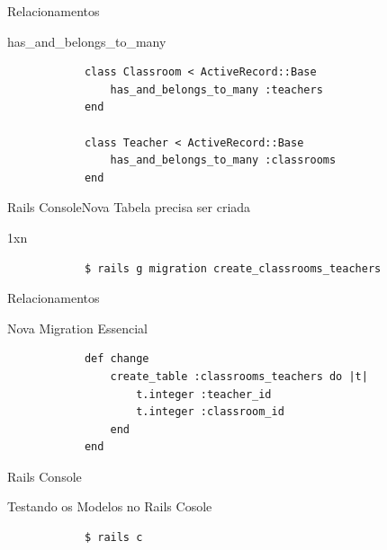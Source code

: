 \documentclass{beamer}
\begin{document}
\begin{frame}[fragile]{Relacionamentos}
	\begin{block} {\LARGE has\_and\_belongs\_to\_many}
		\begin{verbatim}
		  	class Classroom < ActiveRecord::Base
		  	    has_and_belongs_to_many :teachers
		  	end
		  	
		  	class Teacher < ActiveRecord::Base
		  	    has_and_belongs_to_many :classrooms
		  	end
		\end{verbatim}
	\end{block}
\end{frame}

\begin{frame}[fragile]{Rails Console}{Nova Tabela precisa ser criada}
	\begin{block} {1xn}
		\begin{verbatim}
		  	$ rails g migration create_classrooms_teachers
		\end{verbatim}
	\end{block}
\end{frame}

\begin{frame}[fragile]{Relacionamentos}
	\begin{block} {\LARGE Nova Migration Essencial}
		\begin{verbatim}
		    def change
		        create_table :classrooms_teachers do |t|
		            t.integer :teacher_id
		            t.integer :classroom_id			
		        end
		    end
		\end{verbatim}
	\end{block}
\end{frame}

\begin{frame}[fragile]{Rails Console}
	\begin{block} {\LARGE Testando os Modelos no Rails Cosole}
		\begin{verbatim}
			$ rails c
		\end{verbatim}
	\end{block}
\end{frame}

%    
%    
%
% 
%    
%
\end{document}
